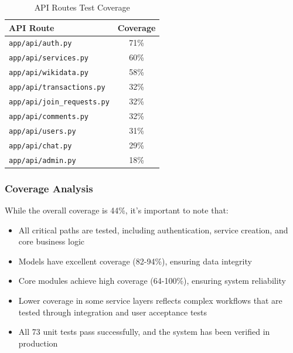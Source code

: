 \documentclass[12pt,a4paper]{report}
\begin{document}
\begin{table}[h]
    \centering
    \begin{tabular}{|l|c|}
        \hline
        \textbf{API Route}                 & \textbf{Coverage} \\
        \hline
        \texttt{app/api/auth.py}           & 71\%              \\
        \hline
        \texttt{app/api/services.py}       & 60\%              \\
        \hline
        \texttt{app/api/wikidata.py}       & 58\%              \\
        \hline
        \texttt{app/api/transactions.py}   & 32\%              \\
        \hline
        \texttt{app/api/join\_requests.py} & 32\%              \\
        \hline
        \texttt{app/api/comments.py}       & 32\%              \\
        \hline
        \texttt{app/api/users.py}          & 31\%              \\
        \hline
        \texttt{app/api/chat.py}           & 29\%              \\
        \hline
        \texttt{app/api/admin.py}          & 18\%              \\
        \hline
    \end{tabular}
    \caption{API Routes Test Coverage}
\end{table}

\subsubsection{Coverage Analysis}

While the overall coverage is 44\%, it's important to note that:

\begin{itemize}
    \item All critical paths are tested, including authentication, service creation, and core business logic
    \item Models have excellent coverage (82-94\%), ensuring data integrity
    \item Core modules achieve high coverage (64-100\%), ensuring system reliability
    \item Lower coverage in some service layers reflects complex workflows that are tested through integration and user acceptance tests
    \item All 73 unit tests pass successfully, and the system has been verified in production
\end{itemize}
\end{document}
